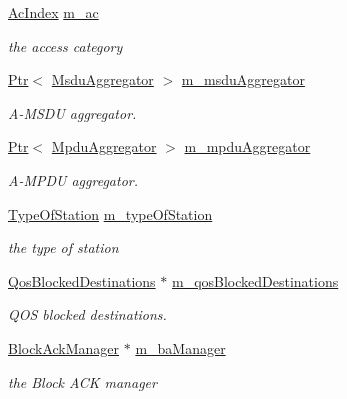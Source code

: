 \begin{DoxyCompactItemize}
\item 
\hyperlink{group__wifi_gab422b4562ba272b39a9b6bca3513f3ac}{Ac\+Index} \hyperlink{classns3_1_1EdcaTxopN_ae385fb8b4514a4fb866739c9a0d2a772}{m\+\_\+ac}
\begin{DoxyCompactList}\small\item\em the access category \end{DoxyCompactList}\item 
\hyperlink{classns3_1_1Ptr}{Ptr}$<$ \hyperlink{classns3_1_1MsduAggregator}{Msdu\+Aggregator} $>$ \hyperlink{classns3_1_1EdcaTxopN_ab4ec029e40b068965e1c7e80b1750027}{m\+\_\+msdu\+Aggregator}
\begin{DoxyCompactList}\small\item\em A-\/\+M\+S\+DU aggregator. \end{DoxyCompactList}\item 
\hyperlink{classns3_1_1Ptr}{Ptr}$<$ \hyperlink{classns3_1_1MpduAggregator}{Mpdu\+Aggregator} $>$ \hyperlink{classns3_1_1EdcaTxopN_abdec6101737b07b2c816c22910d60f53}{m\+\_\+mpdu\+Aggregator}
\begin{DoxyCompactList}\small\item\em A-\/\+M\+P\+DU aggregator. \end{DoxyCompactList}\item 
\hyperlink{namespacens3_a21fd18ff410cecc971a0c27634830445}{Type\+Of\+Station} \hyperlink{classns3_1_1EdcaTxopN_a2c8e52226f121e25a17e176a3a1594bb}{m\+\_\+type\+Of\+Station}
\begin{DoxyCompactList}\small\item\em the type of station \end{DoxyCompactList}\item 
\hyperlink{classns3_1_1QosBlockedDestinations}{Qos\+Blocked\+Destinations} $\ast$ \hyperlink{classns3_1_1EdcaTxopN_a11581df9860f137e60b71cefd399e8b8}{m\+\_\+qos\+Blocked\+Destinations}
\begin{DoxyCompactList}\small\item\em Q\+OS blocked destinations. \end{DoxyCompactList}\item 
\hyperlink{classns3_1_1BlockAckManager}{Block\+Ack\+Manager} $\ast$ \hyperlink{classns3_1_1EdcaTxopN_a7a79eaafe03995bb274451aa752b83b2}{m\+\_\+ba\+Manager}
\begin{DoxyCompactList}\small\item\em the Block A\+CK manager \end{DoxyCompactList}\item 

\end{DoxyCompactItemize}
